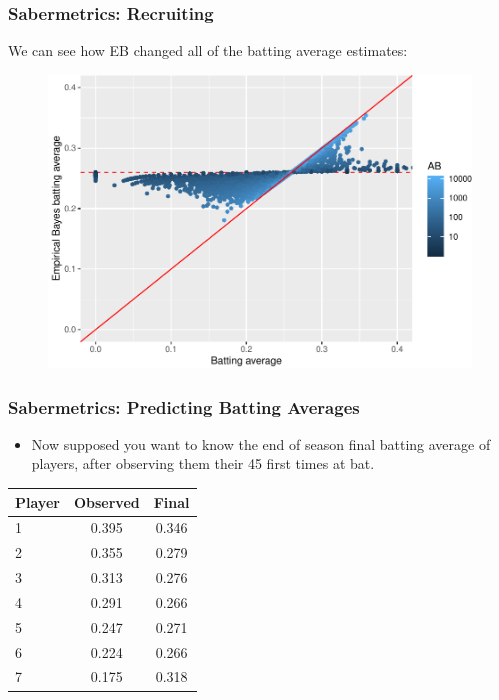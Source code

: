\documentclass[
  shownotes,
  xcolor={svgnames},
  hyperref={colorlinks,citecolor=DarkBlue,linkcolor=DarkRed,urlcolor=DarkBlue}
  , aspectratio=169]{beamer}
\begin{document}
\begin{frame}[fragile]
\frametitle{Sabermetrics: Recruiting}

We can see how EB changed all of the batting average estimates:

\begin{figure}[H] \centering
  \centering
  \includegraphics[scale=0.5]{figures/shrinkage_averages}
  \\
  \tiny 
\end{figure}



\end{frame}
\begin{frame}[fragile]
\frametitle{Sabermetrics: Predicting Batting Averages}

\begin{itemize}
\item Now supposed you want to know the end of season final batting average of players, after observing them their 45 first times at bat.
\end{itemize}


\begin{table}[H]
\begin{tabular}{lcc}
\hline
\hline
Player & Observed & Final \\
\hline
1 & 0.395 & 0.346 \\
2 & 0.355 & 0.279 \\
3 & 0.313 & 0.276 \\
4 & 0.291 & 0.266 \\
5 & 0.247 & 0.271 \\
6 & 0.224 & 0.266 \\
7 & 0.175 & 0.318 \\
\hline
\hline
\end{tabular}
\end{table}
\end{frame}
\end{document}
